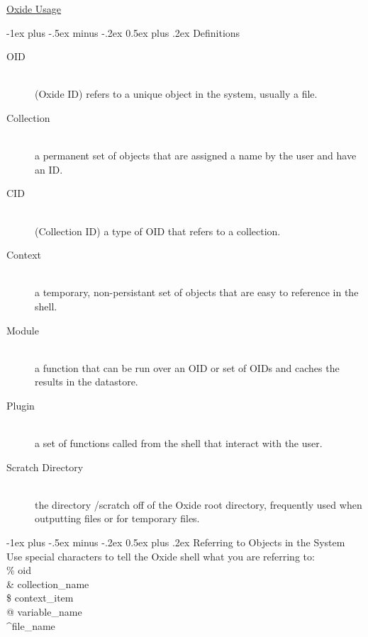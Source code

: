 \documentclass[10pt,landscape]{article}
\makeatletter
\renewcommand{\section}{\@startsection{section}{1}{0mm}%
                                {-1ex plus -.5ex minus -.2ex}%
                                {0.5ex plus .2ex}%
                                {\normalfont\large\bfseries}}
\makeatother
\begin{document}
\raggedright
\footnotesize
\begin{multicols}{3}


\setlength{\premulticols}{1pt}
\setlength{\postmulticols}{1pt}
\setlength{\multicolsep}{1pt}
\setlength{\columnsep}{2pt}

\begin{center}
     \Large{\underline{Oxide Usage}} \\
\end{center}

\section{Definitions}
\begin{description}
  \item[OID] \hfill \\
  (Oxide ID) refers to a unique object in the system, usually a file. 
  \item[Collection] \hfill \\
  a permanent set of objects that are assigned a name by the user and have an ID. 
  \item[CID] \hfill \\
  (Collection ID) a type of OID that refers to a collection.
  \item[Context] \hfill \\
  a temporary, non-persistant set of objects that are easy to reference in the shell.
  \item[Module] \hfill \\
  a function that can be run over an OID or set of OIDs and caches the results in the datastore.
  \item[Plugin] \hfill \\
  a set of functions called from the shell that interact with the user.
  \item[Scratch Directory] \hfill \\
  the directory /scratch off of the Oxide root directory, frequently used when outputting files or for temporary files.
\end{description}

\section{Referring to Objects in the System}
Use special characters to tell the Oxide shell what you are referring to: \\
\% oid \\
\& collection\_name \\
\$ context\_item \\
@ variable\_name \\
\textasciicircum file\_name


\end{multicols}
\end{document}
